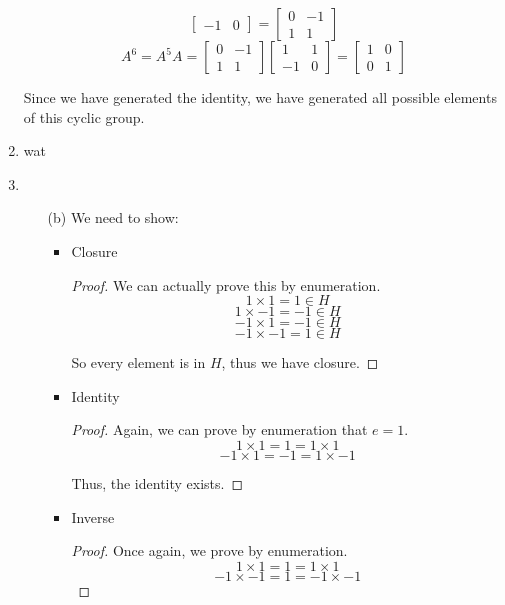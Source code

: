 \documentclass[12pt,letterpaper]{article}
\begin{document}
\begin{enumerate}
\[\begin{bmatrix}
          -1 & 0
        \end{bmatrix}
        =
        \begin{bmatrix}
          0  & -1 \\
          1  & 1
        \end{bmatrix}
      \]
      \[
        A^6 = A^5A =
        \begin{bmatrix}
          0  & -1 \\
          1  & 1
        \end{bmatrix}
        \begin{bmatrix}
          1  & 1  \\
          -1 & 0
        \end{bmatrix}
        =
        \begin{bmatrix}
          1  & 0  \\
          0  & 1
        \end{bmatrix}
      \]

      Since we have generated the identity,
      we have generated all possible elements of this cyclic group.

    \item
      wat

    \item
      \begin{enumerate}
        \item[(b)]
          We need to show:
          \begin{itemize}
            \item Closure
              \begin{proof}
                We can actually prove this by enumeration.
                \[1 \times 1 = 1 \in H\]
                \[1 \times -1 = -1 \in H\]
                \[-1 \times 1 = -1 \in H\]
                \[-1 \times -1 = 1 \in H\]

                So every element is in $H$, thus we have closure.
              \end{proof}
            \item Identity
              \begin{proof}
                Again, we can prove by enumeration that $e = 1$.
                \[1 \times 1 = 1 = 1 \times 1\]
                \[-1 \times 1 = -1 = 1 \times -1\]

                Thus, the identity exists.
              \end{proof}
            \item Inverse
              \begin{proof}
                Once again, we prove by enumeration.
                \[1 \times 1 = 1 = 1 \times 1\]
                \[-1 \times -1 = 1 = -1 \times -1\]


\end{proof}
\end{itemize}
\end{enumerate}
\end{enumerate}
\end{document}
